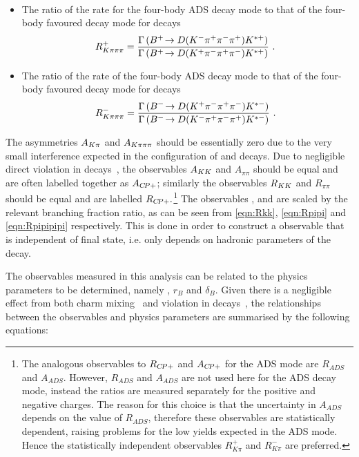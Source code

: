 \begin{itemize}
{{\begin{multline}
\label{eqn:Rpipipipi}
\end{multline}}}
\item{The ratio of the rate for the four-body ADS decay mode to that of the four-body favoured decay mode for \Bp decays
\begin{equation}
R^+_{K\pi\pi\pi} = \frac{\Gamma\left({{{B}^+}}\!\rightarrow {\ensuremath{D}}({{K}^-}{{\pi}^+}{{\pi}^-}{{\pi}^+}){{K}^{*+}}\right)}{\Gamma\left({{{B}^+}}\!\rightarrow {\ensuremath{D}}({{K}^+}{{\pi}^-}{{\pi}^+}{{\pi}^-}){{K}^{*+}}\right)} \text{ . }
\label{eqn:Rplus4body}
\end{equation}
}
\item{The ratio of the rate of the four-body ADS decay mode to that of the four-body favoured decay mode for \Bm decays
\begin{equation}
R^-_{K\pi\pi\pi} = \frac{\Gamma\left({{{B}^-}}\!\rightarrow {\ensuremath{D}}({{K}^+}{{\pi}^-}{{\pi}^+}{{\pi}^-}){{K}^{*-}}\right)}{\Gamma\left({{{B}^-}}\!\rightarrow {\ensuremath{D}}({{K}^-}{{\pi}^+}{{\pi}^-}{{\pi}^+}){{K}^{*-}}\right)} \text{ . }
\label{eqn:Rminus4body}
\end{equation}
}
\end{itemize}

\noindent
The asymmetries $A_{{K}\pi}$ and $A_{{K}\pi\pi\pi}$ should be essentially zero due to the very small interference expected in the configuration of \B and \D decays. Due to negligible direct \CP violation in \D decays~\cite{charmcpv}, the observables $A_{{K}{K}}$ and $A_{\pi\pi}$ should be equal and are often labelled together as $A_{{C\!P}+}$; similarly the observables $R_{{K}{K}}$ and $R_{\pi\pi}$ should be equal and are labelled $R_{{C\!P}+}.$\footnote{The analogous observables to $R_{{C\!P}+}$ and $A_{{C\!P}+}$ for the ADS mode are $R_{ADS}$ and $A_{ADS}$. However, $R_{ADS}$ and $A_{ADS}$ are not used here for the ADS decay mode, instead the ratios are measured separately for the positive and negative charges. The reason for this choice is that the uncertainty in $A_{ADS}$ depends on the value of $R_{ADS}$, therefore these observables are statistically dependent, raising problems for the low yields expected in the ADS mode. Hence the statistically independent observables $R^+_{K\pi}$ and $R^-_{K\pi}$ are preferred.} The observables \Rkk, \Rpipi and \Rpipipipi are scaled by the relevant branching fraction ratio, as can be seen from \eqns\ref{eqn:Rkk}, \ref{eqn:Rpipi} and \ref{eqn:Rpipipipi} respectively. This is done in order to construct a \CP observable that is independent of final state, i.e. only depends on hadronic parameters of the \Bm decay. 

The \CP observables measured in this analysis can be related to the physics parameters to be determined, namely \Pgamma, $r_B$ and $\delta_B$. Given there is a negligible effect from both charm mixing~\cite{charmmixing} and \CP violation in \D decays~\cite{charmcpv}, the relationships between the \CP observables and physics parameters are summarised by the following equations:

